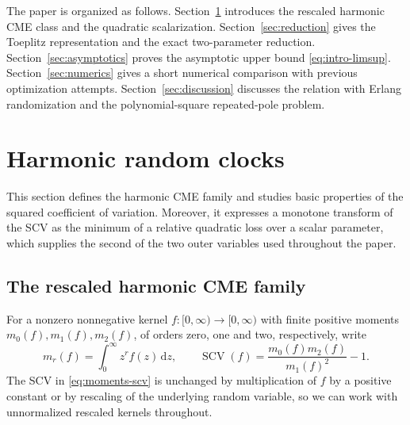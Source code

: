 \documentclass[11pt]{article}
\numberwithin{equation}{section}
\theoremstyle{remark}
\newcommand{\SCV}{\operatorname{SCV}}
\newcommand{\dd}{\,\mathrm d}
\begin{document}
The paper is organized as follows. Section~\ref{sec:harmonic-clocks} introduces the rescaled harmonic CME class and the quadratic scalarization. Section~\ref{sec:reduction} gives the Toeplitz representation and the exact two-parameter reduction. Section~\ref{sec:asymptotics} proves the asymptotic upper bound \eqref{eq:intro-limsup}. Section~\ref{sec:numerics} gives a short numerical comparison with previous optimization attempts. Section~\ref{sec:discussion} discusses the relation with Erlang randomization and the polynomial-square repeated-pole problem.

\section{Harmonic random clocks}\label{sec:harmonic-clocks}

This section defines the harmonic CME family and studies basic properties of the squared coefficient of variation. Moreover, it expresses a monotone transform of the SCV as the minimum of a relative quadratic loss over a scalar parameter, which supplies the second of the two outer variables used throughout the paper.

\subsection{The rescaled harmonic CME family}

For a nonzero nonnegative kernel $f:[0,\infty) \to [0,\infty)$ with finite positive moments $m_0(f),m_1(f),m_2(f)$, of orders zero, one and two, respectively, write
\begin{equation}\label{eq:moments-scv}
  m_r(f)=\int_0^\infty z^r f(z)\dd z,
  \qquad
  \SCV(f)=\frac{m_0(f)m_2(f)}{m_1(f)^2}-1.
\end{equation}
The SCV in \eqref{eq:moments-scv} is unchanged by multiplication of $f$ by a positive constant or by rescaling of the underlying random variable, so we can work with unnormalized rescaled kernels throughout.
\end{document}
